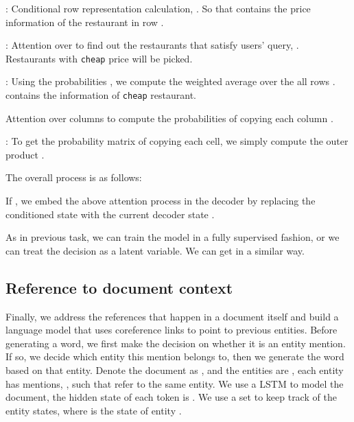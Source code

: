 \documentclass[11pt,letterpaper]{article}
\begin{document}
: Conditional row representation calculation,
. So that  contains the
price information of the restaurant in row .

: Attention over  to find out the restaurants that
satisfy users' query, . Restaurants with
\texttt{cheap} price will be picked.

: Using the probabilities , we compute the
weighted average over the all rows .
 contains the information of \texttt{cheap} restaurant.

 Attention over columns  to compute the
probabilities of copying each column .

: To get the probability matrix of copying each cell, we
simply compute the outer product .

\noindent The overall process is as follows:


If , we embed the above attention process in the decoder by replacing the
conditioned state  with the current decoder state . 



 As in previous task, we can train the model
in a fully supervised fashion, or we can treat the decision as a latent variable.
We can get  in a similar way.









\subsection{Reference to document context}

Finally, we address the references that happen in a document itself and build a
language model that uses coreference links to point to previous
entities. Before generating a word, we first make the decision on whether it is
an entity mention. If so, we decide which entity this mention belongs to, then
we generate the word based on that entity. Denote the document as
, and the entities are , each
entity has  mentions, , such that
 refer to the same entity. We use a LSTM to model
the document, the hidden state of each token is
. We use a set
 to keep track of the entity
states, where  is the state of entity .
\end{document}
